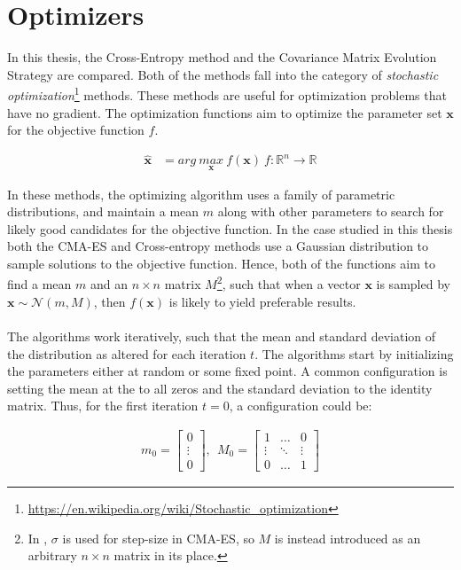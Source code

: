 \section{Optimizers}

In this thesis, the Cross-Entropy method and the Covariance Matrix Evolution 
Strategy are compared. Both of the methods fall into the category of 
\textit{stochastic optimization}\footnote{\url{https://en.wikipedia.org/wiki/Stochastic_optimization}}
methods. These methods are useful for optimization problems that have no gradient.
The optimization functions aim to optimize the parameter set $\textbf{x}$
for the objective function $f$.

\begin{align*}
\hat{\textbf{x}} &= arg \  \underset{\textbf{x}}{max} \  f(\textbf{x}) \ f : \mathbb{R}^{n} \rightarrow \mathbb{R}
\end{align*}

In these methods, the optimizing algorithm uses a family of parametric distributions,
and maintain a mean $m$ along with other parameters
to search for likely good candidates for the objective function.  In the case studied in this thesis
both the CMA-ES and Cross-entropy methods use a Gaussian distribution to sample solutions to the objective function.
Hence, both of the functions aim to find a mean $m$ and an $n \times n$ matrix 
$M$\footnote{In \citep{hansen2011}, $\sigma$ is used for step-size in CMA-ES, so $M$ is instead introduced
as an arbitrary $n \times n$ matrix in its place.}, such that when
a vector $\textbf{x}$ is sampled by $\textbf{x} \sim \mathcal{N}\left( m, M \right)$, then $f(\textbf{x})$ 
is likely to yield preferable results.\\
\\
The algorithms work iteratively, such that the mean and standard deviation of the distribution 
as altered for each iteration $t$.
The algorithms start by initializing the parameters either at random or some fixed point. A common 
configuration is setting the mean at the to all zeros and the standard deviation to the identity matrix.
Thus, for the first iteration $t = 0$, a configuration could be:

\begin{align*}
m_{0} =
\begin{bmatrix}
0\\
\vdots\\
0
\end{bmatrix},\ \ 
M_{0} = 
\begin{bmatrix}
1 & \hdots & 0\\
\vdots & \ddots & \vdots\\
0 & \hdots & 1
\end{bmatrix}
\end{align*}

